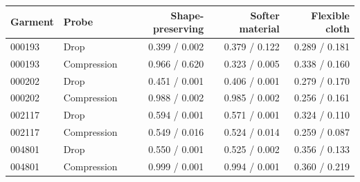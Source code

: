 \begin{tabular}{llrrr}
\toprule
Garment & Probe & Shape-preserving & Softer material & Flexible cloth \\
\midrule
000193 & Drop & 0.399 / 0.002 & 0.379 / 0.122 & 0.289 / 0.181 \\
000193 & Compression & 0.966 / 0.620 & 0.323 / 0.005 & 0.338 / 0.160 \\
000202 & Drop & 0.451 / 0.001 & 0.406 / 0.001 & 0.279 / 0.170 \\
000202 & Compression & 0.988 / 0.002 & 0.985 / 0.002 & 0.256 / 0.161 \\
002117 & Drop & 0.594 / 0.001 & 0.571 / 0.001 & 0.324 / 0.110 \\
002117 & Compression & 0.549 / 0.016 & 0.524 / 0.014 & 0.259 / 0.087 \\
004801 & Drop & 0.550 / 0.001 & 0.525 / 0.002 & 0.356 / 0.133 \\
004801 & Compression & 0.999 / 0.001 & 0.994 / 0.001 & 0.360 / 0.219 \\
\bottomrule
\end{tabular}
